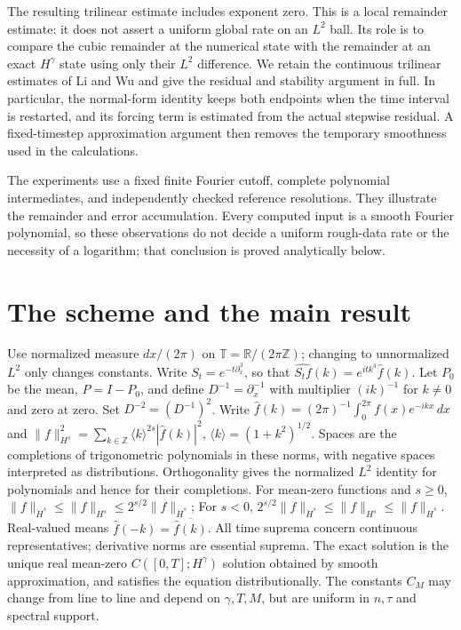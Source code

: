 \documentclass[11pt]{article}
\theoremstyle{remark}\newtheorem{remark}[theorem]{Remark}
\newcommand{\T}{\mathbb T}
\newcommand{\Z}{\mathbb Z}
\newcommand{\R}{\mathbb R}
\newcommand{\ip}{\partial_x^{-1}}
\begin{document}
The resulting trilinear estimate includes exponent zero. This is a local
remainder estimate: it does not assert a uniform global rate on an $L^2$
ball. Its role is to compare the cubic remainder at the numerical state
with the remainder at an exact $H^\gamma$ state using only their $L^2$
difference. We retain the continuous trilinear estimates of Li and Wu
and give the residual and stability argument in full. In particular,
the normal-form identity keeps both endpoints when the time interval is
restarted, and its forcing term is estimated from the actual stepwise
residual. A fixed-timestep approximation argument then removes the
temporary smoothness used in the calculations.

The experiments use a fixed finite Fourier cutoff, complete polynomial
intermediates, and independently checked reference resolutions. They
illustrate the remainder and error accumulation. Every computed input is
a smooth Fourier polynomial, so these observations do not decide a
uniform rough-data rate or the necessity of a logarithm; that conclusion
is proved analytically below.
\section{The scheme and the main result}
Use normalized measure $dx/(2\pi)$ on $\T=\R/(2\pi\Z)$; changing to unnormalized
$L^2$ only changes constants. Write $S_t=e^{-t\partial_x^3}$, so that
$\widehat{S_tf}(k)=e^{itk^3}\widehat f(k)$.
Let $P_0$ be the mean, $P=I-P_0$, and define $D^{-1}=\ip$ with multiplier
$(ik)^{-1}$ for $k\ne0$ and zero at zero. Set $D^{-2}=(D^{-1})^2$.
Write $\widehat f(k)=(2\pi)^{-1}\int_0^{2\pi}f(x)e^{-ikx}\,dx$ and
$\|f\|_{H^s}^2=\sum_{k\in\Z}\langle k\rangle^{2s}|\widehat f(k)|^2$,
$\langle k\rangle=(1+k^2)^{1/2}$. Spaces are the completions of trigonometric
polynomials in these norms, with negative spaces interpreted as distributions.
Orthogonality gives the normalized $L^2$ identity for polynomials and hence
for their completions. For mean-zero functions and $s\geq0$,
$\|f\|_{\dot H^s}\leq\|f\|_{H^s}\leq2^{s/2}\|f\|_{\dot H^s}$;
For $s<0$, $2^{s/2}\|f\|_{\dot H^s}\leq\|f\|_{H^s}\leq\|f\|_{\dot H^s}$.
Real-valued means $\widehat f(-k)=\overline{\widehat f(k)}$.
All time suprema concern continuous representatives; derivative norms are
essential suprema. The exact solution is the unique real mean-zero
$C([0,T];H^\gamma)$ solution obtained by smooth approximation, and satisfies
the equation distributionally. The constants $C_M$ may change from line to line and depend on
$\gamma,T,M$, but are uniform in $n,\tau$ and spectral support.
\end{document}
